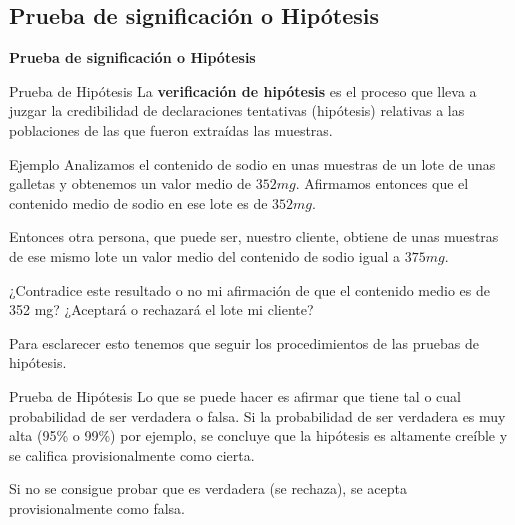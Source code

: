 \documentclass[11pt]{beamer}
\begin{document}
     \subsection{Prueba de significación o Hipótesis}
       \begin{frame}{}
         \begin{center}
             \textbf{\huge Prueba de significación o Hipótesis}
         \end{center}
       \end{frame}
       \begin{frame}{Prueba de Hipótesis}
         La \textbf{verificación de hipótesis}  es el proceso que lleva a juzgar la credibilidad de declaraciones tentativas (hipótesis) relativas a las poblaciones de las que fueron extraídas las muestras.

         \begin{block}{Ejemplo}
             Analizamos el contenido de sodio en unas muestras de un lote de unas galletas y obtenemos un valor medio de $352 mg$. Afirmamos entonces que el contenido medio de sodio en ese lote es de $352 mg$.

             \pause
             Entonces otra persona, que puede ser, nuestro cliente, obtiene de unas muestras de ese mismo lote un valor medio del contenido de sodio igual a $375 mg$.

             \pause
             ¿Contradice este resultado o no mi afirmación de que el contenido medio es de 352 mg? ¿Aceptará o rechazará el lote mi cliente?
         \end{block}
         \pause
         Para esclarecer esto tenemos que seguir los procedimientos de las pruebas de hipótesis.
    \end{frame}

       \begin{frame}{Prueba de Hipótesis}
         \pause
         Lo que se puede hacer es afirmar que tiene tal o cual probabilidad  de ser verdadera o falsa. Si la probabilidad de ser verdadera es muy alta (95\% o 99\%) por ejemplo, se concluye que la hipótesis es altamente creíble y se califica provisionalmente como cierta.

         Si no se consigue probar que es verdadera (se rechaza), se acepta provisionalmente como falsa.

       \end{frame}
\end{document}
